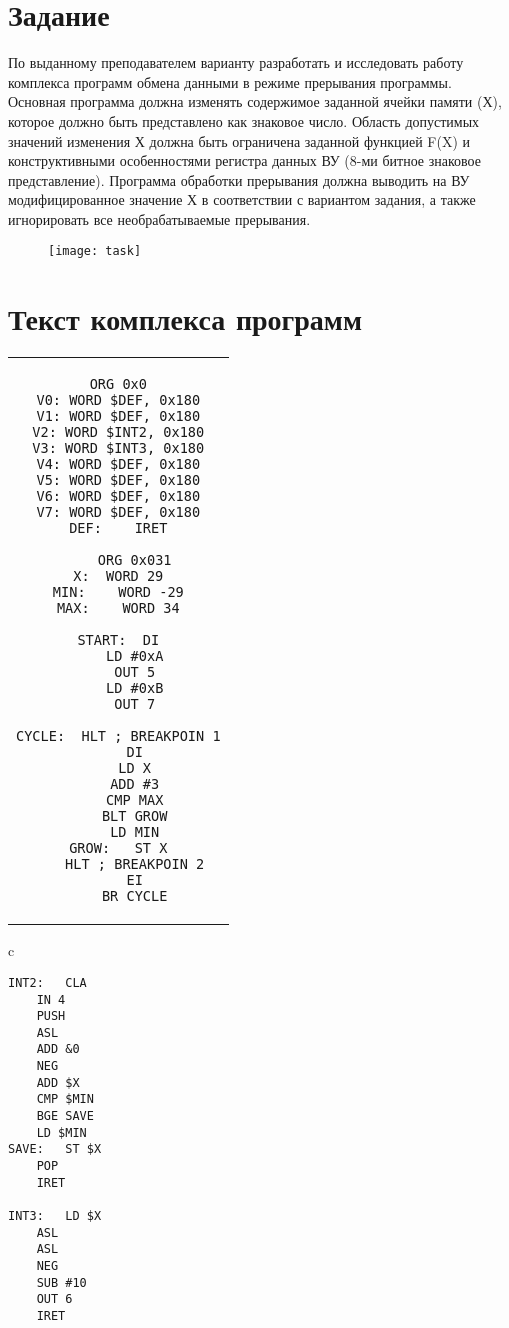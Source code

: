 \tableofcontents

\newpage

\section{Задание}
По выданному преподавателем варианту разработать и исследовать работу комплекса программ обмена данными в режиме прерывания программы. Основная программа должна изменять содержимое заданной ячейки памяти (Х), которое должно быть представлено как знаковое число. Область допустимых значений изменения Х должна быть ограничена заданной функцией F(X) и конструктивными особенностями регистра данных ВУ (8-ми битное знаковое представление). Программа обработки прерывания должна выводить на ВУ модифицированное значение Х в соответствии с вариантом задания, а также игнорировать все необрабатываемые прерывания.
\begin{figure}[H]
\centering
\texttt{[image: task]}
\label{pic:task}
\end{figure}

\section{Текст комплекса программ}
\begin{center}
\begin{tabular}{c}
\begin{lstlisting}[basicstyle=\ttfamily]
	ORG 0x0
V0:	WORD $DEF, 0x180
V1:	WORD $DEF, 0x180
V2:	WORD $INT2, 0x180
V3:	WORD $INT3, 0x180
V4:	WORD $DEF, 0x180
V5:	WORD $DEF, 0x180
V6:	WORD $DEF, 0x180
V7:	WORD $DEF, 0x180
DEF:	IRET

	ORG 0x031
X:	WORD 29
MIN:	WORD -29
MAX:	WORD 34

START:	DI
	LD #0xA
	OUT 5
	LD #0xB
	OUT 7

CYCLE:	HLT	; BREAKPOIN 1
	DI
	LD X
	ADD #3
	CMP MAX
	BLT GROW
	LD MIN
GROW:	ST X
	HLT	; BREAKPOIN 2
	EI
	BR CYCLE
\end{lstlisting}
\end{tabular}
\end{center}

\begin{center}
\begin{tabular}{c}
\begin{lstlisting}[basicstyle=\ttfamily]
INT2:	CLA
	IN 4
	PUSH
	ASL
	ADD &0
	NEG
	ADD $X
	CMP $MIN
	BGE SAVE
	LD $MIN
SAVE:	ST $X
	POP
	IRET

INT3:	LD $X
	ASL
	ASL
	NEG
	SUB #10
	OUT 6
	IRET
\end{lstlisting}
\end{tabular}
\end{center}

